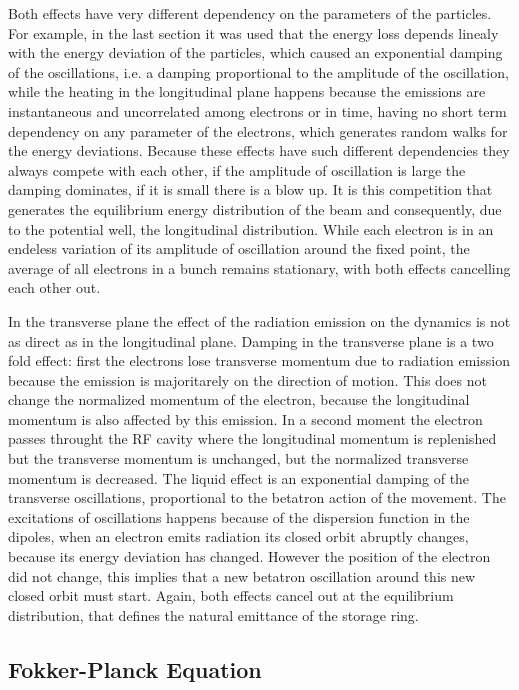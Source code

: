 \documentclass[
	12pt,				%
	openright,			%
	oneside,			%
	a4paper,		%
	chapter=TITLE,		%
	section=TITLE,		%
    brazil,				%
	english,			%
	sumario=tradicional,
	]{abntex2}
\begin{document}
  Both effects have very different dependency on the parameters of the particles. For example, in the last section it was used that the energy loss depends linealy with the energy deviation of the particles, which caused an exponential damping of the oscillations, i.e. a damping proportional to the amplitude of the oscillation, while the heating in the longitudinal plane happens because the emissions are instantaneous and uncorrelated among electrons or in time, having no short term dependency on any parameter of the electrons, which generates random walks for the energy deviations. Because these effects have such different dependencies they always compete with each other, if the amplitude of oscillation is large the damping dominates, if it is small there is a blow up. It is this competition that generates the equilibrium energy distribution of the beam and consequently, due to the potential well, the longitudinal distribution. While each electron is in an endeless variation of its amplitude of oscillation around the fixed point, the average of all electrons in a bunch remains stationary, with both effects cancelling each other out.

  In the transverse plane the effect of the radiation emission on the dynamics is not as direct as in the longitudinal plane. Damping in the transverse plane is a two fold effect: first the electrons lose transverse momentum due to radiation emission because the emission is majoritarely on the direction of motion. This does not change the normalized momentum of the electron, because the longitudinal momentum is also affected by this emission. In a second moment the electron passes throught the RF cavity where the longitudinal momentum is replenished but the transverse momentum is unchanged, but the normalized transverse momentum is decreased. The liquid effect is an exponential damping of the transverse oscillations, proportional to the betatron action of the movement. The excitations of oscillations happens because of the dispersion function in the dipoles, when an electron emits radiation its closed orbit abruptly changes, because its energy deviation has changed. However the position of the electron did not change, this implies that a new betatron oscillation around this new closed orbit must start. Again, both effects cancel out at the equilibrium distribution, that defines the natural emittance of the storage ring.

    \subsection{Fokker-Planck Equation}\label{ssec:fokker_planck_equation}
\end{document}
